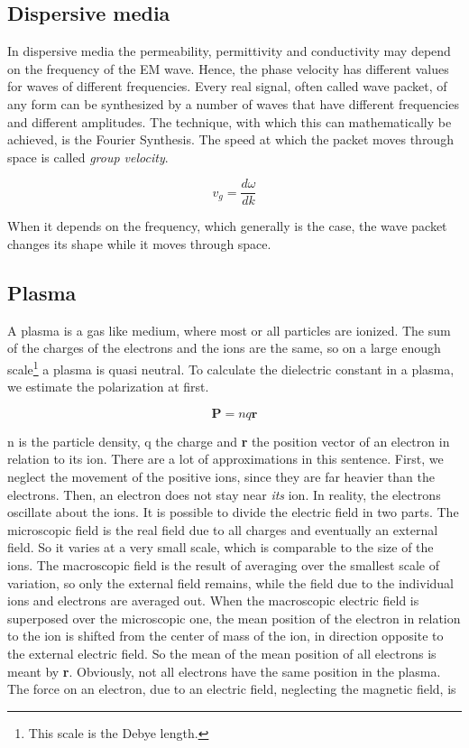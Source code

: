 \documentclass[a4paper,14pt]{extbook}
\begin{document}
\subsection{Dispersive media}
In dispersive media the permeability, permittivity and conductivity may depend on the frequency of the EM wave. Hence, the phase velocity has different values for waves of different frequencies. Every real signal, often called wave packet, of any form can be synthesized by a number of waves that have different frequencies and different amplitudes. The technique, with which this can mathematically be achieved, is the Fourier Synthesis. The speed at which the packet moves through space is called \emph{group velocity}.

\begin{equation}\label{group_velocity}
    v_g=\frac{d \omega}{dk}
\end{equation}

When it depends on the frequency, which generally is the case, the wave packet changes its shape while it moves through space.

\subsection{Plasma}
A plasma is a gas like medium, where most or all particles are ionized. The sum of the charges of the electrons and the ions are the same, so on a large enough scale\footnote{This scale is the Debye length.} a plasma is quasi neutral. To calculate the dielectric constant in a plasma, we estimate the polarization at first.

\begin{equation}\label{polarization}
    \mathbf{P}=nq\mathbf{r}
\end{equation}

n is the particle density, q the charge and \textbf{r} the position vector of an electron in relation to its ion. There are a lot of approximations in this sentence. First, we neglect the movement of the positive ions, since they are far heavier than the electrons. Then, an electron does not stay near \emph{its} ion. In reality, the electrons oscillate about the ions. It is possible to divide the electric field in two parts. The microscopic field is the real field due to all charges and eventually an external field. So it varies at a very small scale, which is comparable to the size of the ions. The macroscopic field is the result of averaging over the smallest scale of variation, so only the external field remains, while the field due to the individual ions and electrons are averaged out. When the macroscopic electric field is superposed over the microscopic one, the mean position of the electron in relation to the ion is shifted from the center of mass of the ion, in direction opposite to the external electric field. So the mean of the mean position of all electrons is meant by \textbf{r}. Obviously, not all electrons have the same position in the plasma. The force on an electron, due to an electric field, neglecting the magnetic field, is
\end{document}
